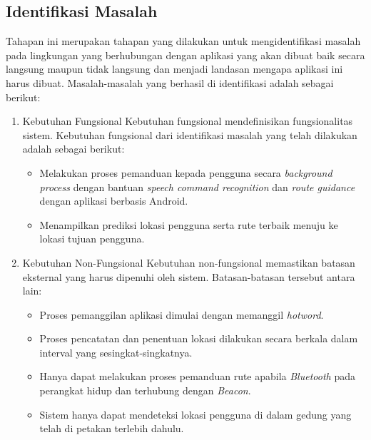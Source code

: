 \fancyhf{} 
\fancyfoot[R]{\thepage}

\subsection{Identifikasi Masalah}
Tahapan ini merupakan tahapan yang dilakukan untuk mengidentifikasi masalah pada lingkungan yang berhubungan dengan aplikasi yang akan dibuat baik secara langsung maupun tidak langsung dan menjadi landasan mengapa aplikasi ini harus dibuat. Masalah-masalah yang berhasil di identifikasi adalah sebagai berikut:

\begin{enumerate}
\item Kebutuhan Fungsional
Kebutuhan fungsional mendefinisikan fungsionalitas sistem. Kebutuhan fungsional dari identifikasi masalah yang telah dilakukan adalah sebagai berikut:

\begin{itemize}
\item Melakukan proses pemanduan kepada pengguna secara \textit{background process} dengan bantuan \textit{speech command recognition} dan \textit{route guidance} dengan aplikasi berbasis Android.

\item Menampilkan prediksi lokasi pengguna serta rute terbaik menuju ke lokasi tujuan pengguna.

\end{itemize}


\newpage
\item Kebutuhan Non-Fungsional
Kebutuhan non-fungsional memastikan batasan eksternal yang harus dipenuhi oleh sistem. Batasan-batasan tersebut antara lain:

\begin{itemize}
\item Proses pemanggilan aplikasi dimulai dengan memanggil \textit{hotword}.

\item Proses pencatatan dan penentuan lokasi dilakukan secara berkala dalam interval yang sesingkat-singkatnya.

\item Hanya dapat melakukan proses pemanduan rute apabila \textit{Bluetooth} pada perangkat hidup dan terhubung dengan \textit{Beacon}.

\item Sistem hanya dapat mendeteksi lokasi pengguna di dalam gedung yang telah di petakan terlebih dahulu.

\end{itemize}

\end{enumerate}

